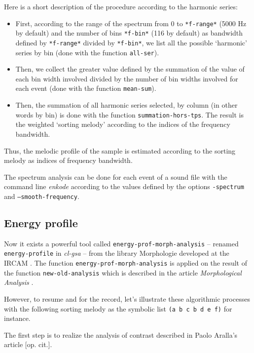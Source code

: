 Here is a short description of the procedure according to the harmonic series:
\begin{itemize}
  \item First, according to the range of the spectrum from 0 to \texttt{*f-range*} (5000 Hz by default) and the number of bins \texttt{*f-bin*} (116 by default) as bandwidth defined by \texttt{*f-range*} divided by \texttt{*f-bin*}, we list all the possible `harmonic' series by bin (done with the function \texttt{all-ser}).
  \item Then, we collect the greater value defined by the summation of the value of each bin width involved divided by the number of bin widths involved for each event (done with the function \texttt{mean-sum}).
  \item Then, the summation of all harmonic series selected, by column (in other words by bin) is done with the function \texttt{summation-hors-tps}. The result is the weighted `sorting melody' according to the indices of the frequency bandwidth.
\end{itemize}

Thus, the melodic profile of the sample is estimated according to the sorting melody as indices of frequency bandwidth.

\bigskip 

The spectrum analysis can be done for each event of a sound file with the command line \textsl{enkode} according to the values defined by the options \texttt{-spectrum} and \texttt{--smooth-frequency}.

\subsection{Energy profile}

Now it exists a powerful tool called \texttt{energy-prof-morph-analysis} -- renamed \texttt{energy-profile} in \textsl{cl-gsa} -- from the library Morphologie developed at the IRCAM \citep{mp}. The function \texttt{energy-prof-morph-analysis} is applied on the result of the function \texttt{new-old-analysis} which is described in the article \textit{Morphological Analysis} \citep{ma}.

\bigskip 

However, to resume and for the record, let's illustrate these algorithmic processes with the following sorting melody as the symbolic list \texttt{(a b c b d e f)} for instance.

The first step is to realize the analysis of contrast described in Paolo Aralla's article [op. cit.].


